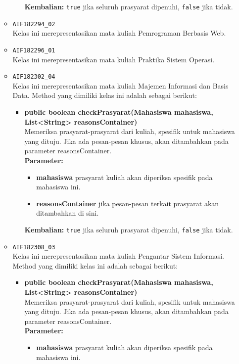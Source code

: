 \begin{enumerate}
\begin{itemize}
\begin{itemize}
\begin{itemize}
			\end{itemize}
			\textbf{Kembalian:} \texttt{true} jika seluruh prasyarat dipenuhi, \texttt{false} jika tidak.
		\end{itemize}
		\item \texttt{AIF182294\_02} \\
		Kelas ini merepresentasikan mata kuliah Pemrograman Berbasis Web.
		\item \texttt{AIF182296\_01} \\
		Kelas ini merepresentasikan mata kuliah Praktika Sistem Operasi.
		\item \texttt{AIF182302\_04} \\
		Kelas ini merepresentasikan mata kuliah Majemen Informasi dan Basis Data. Method yang dimiliki kelas ini adalah sebagai berikut: 
		\begin{itemize}
			\item \textbf{public boolean checkPrasyarat(Mahasiswa mahasiswa, List<String> reasonsContainer)}\\
			Memeriksa prasyarat-prasyarat dari kuliah, spesifik untuk mahasiswa yang dituju. Jika ada pesan-pesan khusus, akan ditambahkan pada parameter reasonsContainer.\\
			\textbf{Parameter:}
			\begin{itemize}
				\item \textbf{mahasiswa} prasyarat kuliah akan diperiksa spesifik pada mahasiswa ini.
				\item \textbf{reasonsContainer} jika pesan-pesan terkait prasyarat akan ditambahkan di sini.
			\end{itemize}
			\textbf{Kembalian:} \texttt{true} jika seluruh prasyarat dipenuhi, \texttt{false} jika tidak.
		\end{itemize}
		\item \texttt{AIF182308\_03} \\
		Kelas ini merepresentasikan mata kuliah Pengantar Sistem Informasi. Method yang dimiliki kelas ini adalah sebagai berikut: 
		\begin{itemize}
			\item \textbf{public boolean checkPrasyarat(Mahasiswa mahasiswa, List<String> reasonsContainer)}\\
			Memeriksa prasyarat-prasyarat dari kuliah, spesifik untuk mahasiswa yang dituju. Jika ada pesan-pesan khusus, akan ditambahkan pada parameter reasonsContainer.\\
			\textbf{Parameter:}
			\begin{itemize}
				\item \textbf{mahasiswa} prasyarat kuliah akan diperiksa spesifik pada mahasiswa ini.

\end{itemize}
\end{itemize}
\end{itemize}
\end{enumerate}
